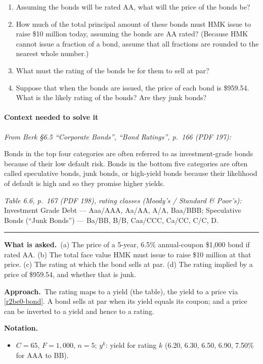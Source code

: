 \documentclass[11pt,a4paper]{article}
\newcommand{\notation}{\par\noindent\textbf{Notation.}}
\newcommand{\asked}{\par\medskip\noindent\textbf{What is asked.}~}
\newcommand{\approach}{\par\smallskip\noindent\textbf{Approach.}~}
\newcommand{\stmtend}{\par\endgroup\nopagebreak\noindent\rule{\linewidth}{0.4pt}\par\medskip}
\begin{document}
\begin{enumerate}
\def\labelenumi{\alph{enumi}.}
\item
  Assuming the bonds will be rated AA, what will the price of the bonds be?
\item
  How much of the total principal amount of these bonds must HMK issue to raise \$10 million today,
  assuming the bonds are AA rated? (Because HMK cannot issue a fraction of a bond, assume that all
  fractions are rounded to the nearest whole number.)
\item
  What must the rating of the bonds be for them to sell at par?
\item
  Suppose that when the bonds are issued, the price of each bond is \$959.54. What is the likely
  rating of the bonds? Are they junk bonds?
\end{enumerate}

\paragraph{Context needed to solve it}

\emph{From Berk §6.5 ``Corporate Bonds'', ``Bond Ratings'', p.~166 (PDF 197):}

Bonds in the top four categories are often referred to as investment-grade bonds because of their
low default risk. Bonds in the bottom five categories are often called speculative bonds, junk
bonds, or high-yield bonds because their likelihood of default is high and so they promise higher
yields.

\emph{Table 6.6, p.~167 (PDF 198), rating classes (Moody's / Standard \& Poor's):} Investment Grade
Debt --- Aaa/AAA, Aa/AA, A/A, Baa/BBB; Speculative Bonds (``Junk Bonds'') --- Ba/BB, B/B, Caa/CCC,
Ca/CC, C/C, D.
\stmtend

\asked (a) The price of a 5-year, 6.5\% annual-coupon \$1,000 bond if rated AA. (b) The total face value HMK must issue to
raise \$10 million at that price. (c) The rating at which the bond sells at par. (d) The rating implied by a price of \$959.54,
and whether that is junk.

\approach The rating maps to a yield (the table), the yield to a price via \eqref{r2be0-bond}. A bond sells at par when its
yield equals its coupon; and a price can be inverted to a yield and hence to a rating.

\notation
\begin{itemize}
  \item $C=65$, $F=1{,}000$, $n=5$; $y^{k}$: yield for rating $k$ (6.20, 6.30, 6.50, 6.90, 7.50\% for AAA to BB).
\end{itemize}
\end{document}
